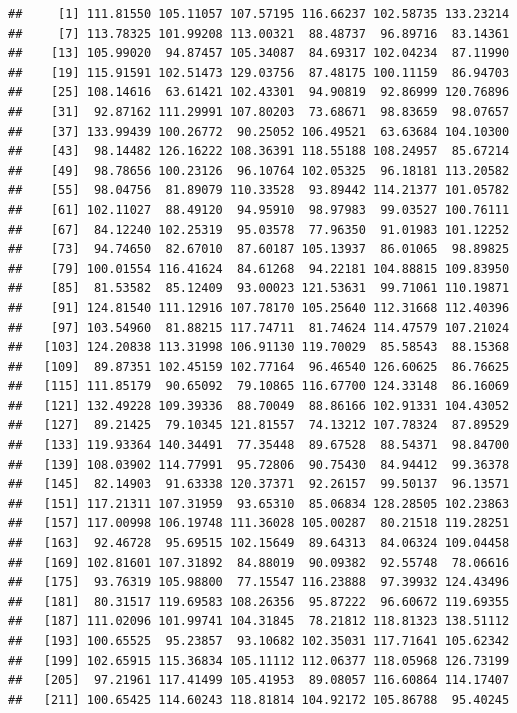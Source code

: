 \documentclass[
]{article}
\begin{document}
\begin{verbatim}
##     [1] 111.81550 105.11057 107.57195 116.66237 102.58735 133.23214
##     [7] 113.78325 101.99208 113.00321  88.48737  96.89716  83.14361
##    [13] 105.99020  94.87457 105.34087  84.69317 102.04234  87.11990
##    [19] 115.91591 102.51473 129.03756  87.48175 100.11159  86.94703
##    [25] 108.14616  63.61421 102.43301  94.90819  92.86999 120.76896
##    [31]  92.87162 111.29991 107.80203  73.68671  98.83659  98.07657
##    [37] 133.99439 100.26772  90.25052 106.49521  63.63684 104.10300
##    [43]  98.14482 126.16222 108.36391 118.55188 108.24957  85.67214
##    [49]  98.78656 100.23126  96.10764 102.05325  96.18181 113.20582
##    [55]  98.04756  81.89079 110.33528  93.89442 114.21377 101.05782
##    [61] 102.11027  88.49120  94.95910  98.97983  99.03527 100.76111
##    [67]  84.12240 102.25319  95.03578  77.96350  91.01983 101.12252
##    [73]  94.74650  82.67010  87.60187 105.13937  86.01065  98.89825
##    [79] 100.01554 116.41624  84.61268  94.22181 104.88815 109.83950
##    [85]  81.53582  85.12409  93.00023 121.53631  99.71061 110.19871
##    [91] 124.81540 111.12916 107.78170 105.25640 112.31668 112.40396
##    [97] 103.54960  81.88215 117.74711  81.74624 114.47579 107.21024
##   [103] 124.20838 113.31998 106.91130 119.70029  85.58543  88.15368
##   [109]  89.87351 102.45159 102.77164  96.46540 126.60625  86.76625
##   [115] 111.85179  90.65092  79.10865 116.67700 124.33148  86.16069
##   [121] 132.49228 109.39336  88.70049  88.86166 102.91331 104.43052
##   [127]  89.21425  79.10345 121.81557  74.13212 107.78324  87.89529
##   [133] 119.93364 140.34491  77.35448  89.67528  88.54371  98.84700
##   [139] 108.03902 114.77991  95.72806  90.75430  84.94412  99.36378
##   [145]  82.14903  91.63338 120.37371  92.26157  99.50137  96.13571
##   [151] 117.21311 107.31959  93.65310  85.06834 128.28505 102.23863
##   [157] 117.00998 106.19748 111.36028 105.00287  80.21518 119.28251
##   [163]  92.46728  95.69515 102.15649  89.64313  84.06324 109.04458
##   [169] 102.81601 107.31892  84.88019  90.09382  92.55748  78.06616
##   [175]  93.76319 105.98800  77.15547 116.23888  97.39932 124.43496
##   [181]  80.31517 119.69583 108.26356  95.87222  96.60672 119.69355
##   [187] 111.02096 101.99741 104.31845  78.21812 118.81323 138.51112
##   [193] 100.65525  95.23857  93.10682 102.35031 117.71641 105.62342
##   [199] 102.65915 115.36834 105.11112 112.06377 118.05968 126.73199
##   [205]  97.21961 117.41499 105.41953  89.08057 116.60864 114.17407
##   [211] 100.65425 114.60243 118.81814 104.92172 105.86788  95.40245

\end{verbatim}
\end{document}
